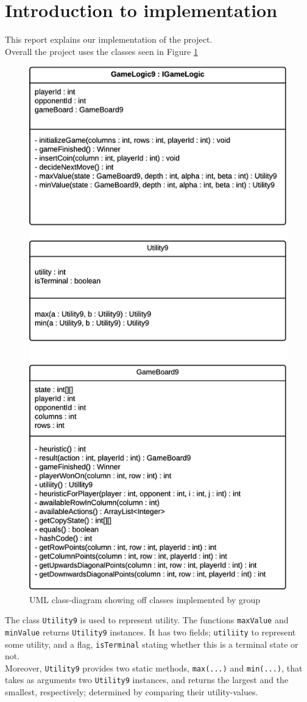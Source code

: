 \section{Introduction to implementation}
This report explains our implementation of the project. \\
Overall the project uses the classes seen in Figure \ref{fig:UMLClassDiagram}

\begin{figure}[h!]
\centering
\includegraphics[width=0.65\linewidth]{ClassDiagram.png}
\caption{UML class-diagram showing off classes implemented by group \label{fig:UMLClassDiagram}}
\end{figure}

The class \texttt{Utility9} is used to represent utility. The functions \texttt{maxValue} and \texttt{minValue} returns \texttt{Utility9} instances. It has two fields; \texttt{utiliity} to represent some utility, and a flag, \texttt{isTerminal} stating whether this is a terminal state or not. \\
Moreover, \texttt{Utility9} provides two static methods, \texttt{max(...)} and \texttt{min(...)}, that takes as arguments two \texttt{Utility9} instances, and returns the largest and the smallest, respectively; determined by comparing their utility-values. 

